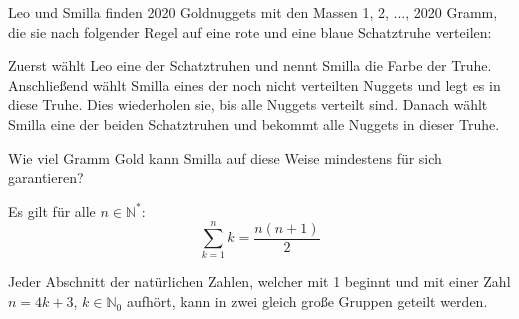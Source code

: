 \documentclass[10pt, a4paper]{amsart}
\begin{document}
\thispagestyle{fancy}
\begin{aufgabe}
  Leo und Smilla finden 2020 Goldnuggets mit den Massen 1, 2, ..., 2020 Gramm,
  die sie nach folgender Regel auf eine rote und eine blaue Schatztruhe
  verteilen:
  
  Zuerst wählt Leo eine der Schatztruhen und nennt Smilla die Farbe der Truhe.
  Anschließend wählt Smilla eines der noch nicht verteilten Nuggets und legt es
  in diese Truhe. Dies wiederholen sie, bis alle Nuggets verteilt sind. Danach
  wählt Smilla eine der beiden Schatztruhen und bekommt alle Nuggets in dieser
  Truhe.

  Wie viel Gramm Gold kann Smilla auf diese Weise mindestens für sich
  garantieren?
\end{aufgabe}
\begin{lemma}\label{sec1:Zahlensumme}
  Es gilt für alle $n∈ℕ^*$:
  \[ \sum^{n}_{k=1}k=\dfrac{n(n+1)}{2}\]
\end{lemma}
\begin{lemma}
  \label{sec1:zahlengruppen}
  Jeder Abschnitt der natürlichen Zahlen, welcher mit 1 beginnt und mit einer
  Zahl $n=4k+3$, $k∈ℕ_0$ aufhört, kann in zwei gleich große Gruppen geteilt
  werden.
\end{lemma}
\end{document}
